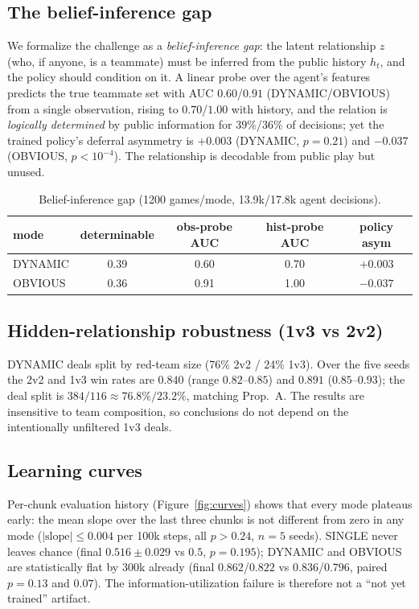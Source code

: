 \documentclass{article}
\begin{document}
\subsection{The belief-inference gap}
\label{sec:beliefgap}
We formalize the challenge as a \emph{belief-inference gap}: the latent
relationship $z$ (who, if anyone, is a teammate) must be inferred from the
public history $h_t$, and the policy should condition on it. A linear probe over
the agent's features predicts the true teammate set with AUC $0.60$/$0.91$
(DYNAMIC/OBVIOUS) from a single observation, rising to $0.70$/$1.00$ with
history, and the relation is \emph{logically determined} by public information
for $39\%$/$36\%$ of decisions; yet the trained policy's deferral asymmetry is
$+0.003$ (DYNAMIC, $p=0.21$) and $-0.037$ (OBVIOUS, $p<10^{-4}$). The
relationship is decodable from public play but unused.

\begin{table}[t]
\centering
\small
\caption{Belief-inference gap (1200 games/mode, 13.9k/17.8k agent decisions).}
\label{tab:beliefgap}
\begin{tabular}{lcccc}
\toprule
mode & determinable & obs-probe AUC & hist-probe AUC & policy asym \\
\midrule
DYNAMIC & 0.39 & 0.60 & 0.70 & $+0.003$ \\
OBVIOUS & 0.36 & 0.91 & 1.00 & $-0.037$ \\
\bottomrule
\end{tabular}
\end{table}

\subsection{Hidden-relationship robustness (1v3 vs 2v2)}
DYNAMIC deals split by red-team size (76\% 2v2 / 24\% 1v3). Over the five seeds
the 2v2 and 1v3 win rates are $0.840$ (range $0.82$--$0.85$) and $0.891$
($0.85$--$0.93$); the deal split is $384/116 \approx 76.8\%/23.2\%$, matching
Prop.~A. The results are insensitive to team composition, so conclusions do not
depend on the intentionally unfiltered 1v3 deals.

\subsection{Learning curves}
Per-chunk evaluation history (Figure~\ref{fig:curves}) shows that every mode
plateaus early: the mean slope over the last three chunks is not different from
zero in any mode ($|\text{slope}| \le 0.004$ per 100k steps, all $p>0.24$,
$n=5$ seeds). SINGLE never leaves chance (final $0.516 \pm 0.029$ vs $0.5$,
$p=0.195$); DYNAMIC and OBVIOUS are statistically flat by 300k already (final
$0.862$/$0.822$ vs $0.836$/$0.796$, paired $p=0.13$ and $0.07$). The
information-utilization failure is therefore not a ``not yet trained''
artifact.
\end{document}
